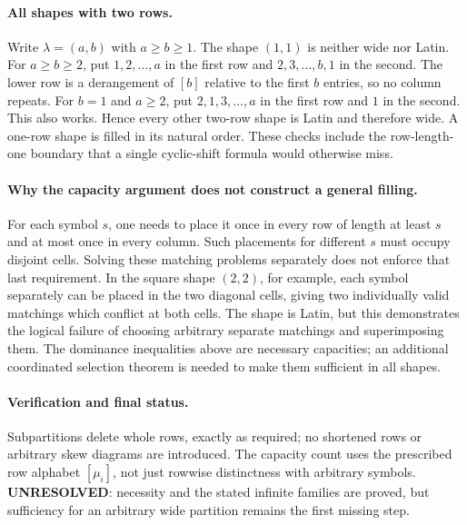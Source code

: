 \documentclass[11pt,a4paper]{article}
\begin{document}
\paragraph{All shapes with two rows.}
Write $\lambda=(a,b)$ with $a\ge b\ge1$. The shape $(1,1)$ is
neither wide nor Latin. For $a\ge b\ge2$, put $1,2,\ldots,a$ in
the first row and $2,3,\ldots,b,1$ in the second. The lower row is
a derangement of $[b]$ relative to the first $b$ entries, so no
column repeats. For $b=1$ and $a\ge2$, put
$2,1,3,\ldots,a$ in the first row and $1$ in the second. This
also works. Hence every other two-row shape is Latin and therefore
wide. A one-row shape is filled in its natural order. These checks
include the row-length-one boundary that a single cyclic-shift formula
would otherwise miss.

\paragraph{Why the capacity argument does not construct a general filling.}
For each symbol $s$, one needs to place it once in every row of
length at least $s$ and at most once in every column. Such placements
for different $s$ must occupy disjoint cells. Solving these matching
problems separately does not enforce that last requirement. In the
square shape $(2,2)$, for example, each symbol separately can be
placed in the two diagonal cells, giving two individually valid
matchings which conflict at both cells. The shape is Latin, but this
demonstrates the logical failure of choosing arbitrary separate
matchings and superimposing them. The dominance inequalities above
are necessary capacities; an additional coordinated selection theorem
is needed to make them sufficient in all shapes.

\paragraph{Verification and final status.}
Subpartitions delete whole rows, exactly as required; no shortened
rows or arbitrary skew diagrams are introduced. The capacity count
uses the prescribed row alphabet $[\mu_i]$, not just rowwise
distinctness with arbitrary symbols. \textbf{UNRESOLVED}: necessity
and the stated infinite families are proved, but sufficiency for an
arbitrary wide partition remains the first missing step.
\end{document}
